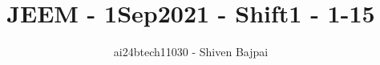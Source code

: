 \documentclass[journal]{IEEEtran}
\begin{document}
\onecolumn

\vspace{3cm}

\renewcommand{\thefigure}{\theenumi}
\renewcommand{\thetable}{\theenumi}

\title{JEEM - 1Sep2021 - Shift1 - 1-15}
\author{ai24btech11030 - Shiven Bajpai}
\maketitle

\iffalse
\begin{multicols}{4}
\begin{enumerate}
    \item 
    \item 
    \item 
    \item 
\end{enumerate}
\end{multicols}
\fi
\end{document}
